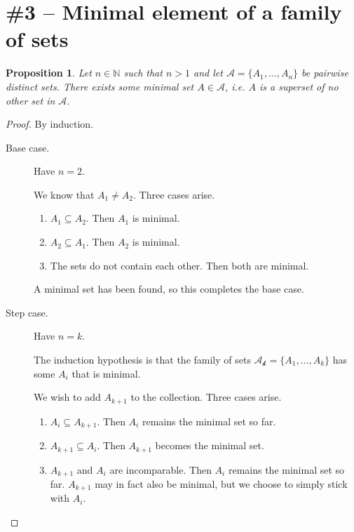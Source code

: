 \documentclass[11pt,letterpaper]{article}
\newtheorem{prop}{Proposition}
\begin{document}
\section*{\#3 -- Minimal element of a family of sets}

\begin{prop}
    Let $n \in \mathbb{N}$ such that $n > 1$ and let
    $\mathcal{A} = \{A_1, \ldots, A_n\}$ be pairwise distinct sets.
    There exists some minimal set $A \in \mathcal{A}$, i.e. $A$ is a superset
    of no other set in $\mathcal{A}$.
\end{prop}

\begin{proof}
    By induction.

    \begin{description}
        \item[Base case.]
            Have $n = 2$.

            We know that $A_1 \neq A_2$. Three cases arise.

            \begin{enumerate}
                \item $A_1 \subseteq A_2$. Then $A_1$ is minimal.
                \item $A_2 \subseteq A_1$. Then $A_2$ is minimal.
                \item The sets do not contain each other.
                    Then both are minimal.
            \end{enumerate}

            A minimal set has been found, so this completes the base case.

        \item[Step case.]
            Have $n = k$.

            The induction hypothesis is that the family of sets
            $\mathcal{A_k} = \{A_1, \ldots, A_k\}$ has some $A_i$ that is
            minimal.

            We wish to add $A_{k+1}$ to the collection. Three cases arise.

            \begin{enumerate}
                \item $A_i \subseteq A_{k+1}$.
                    Then $A_i$ remains the minimal set so far.
                \item $A_{k+1} \subseteq A_i$.
                    Then $A_{k+1}$ becomes the minimal set.
                \item $A_{k+1}$ and $A_i$ are incomparable.
                    Then $A_i$ remains the minimal set so far. $A_{k+1}$ may in
                    fact also be minimal, but we choose to simply stick with
                    $A_i$.
            \end{enumerate}
    \end{description}
\end{proof}
\end{document}
